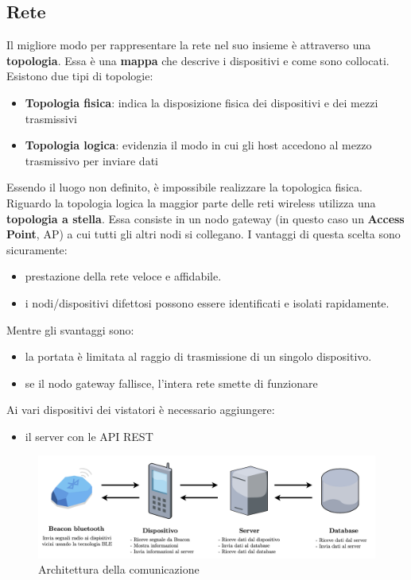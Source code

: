 \subsection{Rete}
Il migliore modo per rappresentare la rete nel suo insieme è attraverso una \textbf{topologia}. Essa è una \textbf{mappa} che descrive i dispositivi e come sono collocati. Esistono due tipi di topologie:
\begin{itemize}
    \item \textbf{Topologia fisica}: indica la disposizione fisica dei dispositivi e dei mezzi trasmissivi
    \item \textbf{Topologia logica}: evidenzia il modo in cui gli host accedono al mezzo trasmissivo per inviare dati
\end{itemize}Essendo il luogo non definito, è impossibile realizzare la topologica fisica. Riguardo la topologia logica la maggior parte delle reti wireless utilizza una \textbf{topologia a stella}. Essa consiste in un nodo gateway (in questo caso un \textbf{Access Point}, AP) a cui tutti gli altri nodi si collegano. I vantaggi di questa scelta sono sicuramente:
\begin{itemize}
    \item prestazione della rete veloce e affidabile.
    \item i nodi/dispositivi difettosi possono essere identificati e isolati rapidamente.
\end{itemize}
Mentre gli svantaggi sono: 
\begin{itemize}
    \item la portata è limitata al raggio di trasmissione di un singolo dispositivo.
    \item se il nodo gateway fallisce, l'intera rete smette di funzionare
\end{itemize}

Ai vari dispositivi dei vistatori è necessario aggiungere:
\begin{itemize}
    \item il server con le API REST
\end{itemize}

\begin{center}
    \begin{figure}[htp]
        \centering
        \includegraphics[width=15cm]{diagrams/diagramma_comunicazione.png}
        \caption{Architettura della comunicazione}
        \label{fig:architettura_comunicazione}
    \end{figure}
    \end{center}

